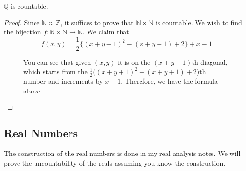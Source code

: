   \begin{theorem}
    $\mathbb{Q}$ is countable. 
  \end{theorem}
  \begin{proof}
    Since $\mathbb{N} \approx \mathbb{Z}$, it suffices to prove that $\mathbb{N} \times \mathbb{N}$ is countable. We wish to find the bijection $f: \mathbb{N} \times \mathbb{N} \rightarrow \mathbb{N}$. We claim that 
    \begin{equation}
      f(x, y) = \frac{1}{2} \big\{ (x + y - 1)^2 - (x + y - 1) + 2 \big\} + x - 1
    \end{equation}
    \begin{figure}[H]
      \centering 
      \caption{You can see that given $(x, y)$ it is on the $(x+y+1)$th diagonal, which starts from the $\frac{1}{2} \big((x+y+1)^2 - (x+y+1) + 2)$th number and increments by $x-1$. Therefore, we have the formula above. } 
      \label{fig:rationals_countable}
    \end{figure}
  \end{proof}

\subsection{Real Numbers} 

  The construction of the real numbers is done in my real analysis notes. We will prove the uncountability of the reals assuming you know the construction. 

